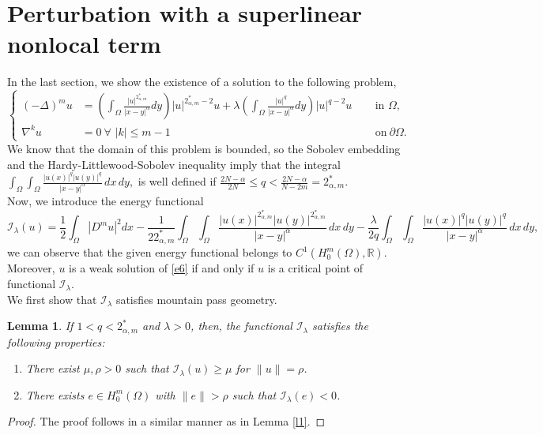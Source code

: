 \documentclass[reqno]{amsart}
\newtheorem{lemma}[theorem]{Lemma}
\newcommand{\la} {\lambda}
\newcommand{\Om}{\Omega}
\newcommand{\al} {\alpha}
\newcommand{\noi} {  \noindent}
\newcommand{\mb} {\mathbb}
\newcommand{\mc} {\mathcal}
\numberwithin{theorem}{section} \numberwithin{equation}{section}
\begin{document}
\section{\bf{Perturbation with a superlinear nonlocal term}}
\noi In the last section, we show the existence of a solution to the following problem,
\[
\left\{\begin{aligned}
(-\Delta)^m u&=\left(\int_{\Om} \frac{|u|^{2_{\al, m}^*}}{|x-y|^\al} d y\right)|u|^{2_{\al, m}^*-2} u+\la\left(\int_{\Om} \frac{|u|^q}{|x-y|^\al} d y\right)|u|^{q-2} u \,&& \text { in } \Om, \\
\nabla^k u&=0\ \forall \, \,  |k|\leq m-1 \,&& \text{ on}\ \partial \Om  .\end{aligned}\right.
\]
We know that the domain of this problem is bounded, so the Sobolev embedding and the Hardy-Littlewood-Sobolev inequality imply that the integral
$\int_{\Om} \int_{\Om} \frac{|u(x)|^q|u(y)|^q}{|x-y|^\al} \, dx \, dy,$
is well defined if $\frac{2N-\al}{2N} \leq q < \frac{2N-\al}{N-2m}=2_{\al, m}^*.$\\
Now, we introduce the energy functional
\[
\mc{I_\la}(u)=\frac{1}{2} \int_{\Om}|D^m u|^2 d x-\frac{1}{22_{\al, m}^*} \int_{\Om} \int_{\Om} \frac{|u(x)|^{2_{\al, m}^*}|u(y)|^{2_{\al, m}^*}}{|x-y|^\al} \, dx \, dy-\frac{\la}{2q} \int_{\Om} \int_{\Om} \frac{|u(x)|^q|u(y)|^q}{|x-y|^\al} \, dx \, dy,
\]
we can observe that the given energy functional belongs to $C^1(H_0^m(\Om), \mb{R})$. Moreover, $u$ is a weak solution of \eqref{e6} if and only if $u$ is a critical point of functional $\mc{I_\la}$.\\
We first show that $\mc{I_\la}$ satisfies mountain pass geometry.
\begin{lemma}\label{l6}
If $1<q<2_{\al, m}^*$ and $\la>0$, then, the functional $\mc{I_\la}$ satisfies the following properties:
\begin{enumerate}
\item There exist $\mu, \rho>0$ such that $\mc{I_\la}(u) \geq \mu$ for $\|u\|=\rho$.
\item There exists $e \in H_0^m(\Om)$ with $\|e\|>\rho$ such that $\mc{I_\la}(e)<0$.
\end{enumerate}
\end{lemma}
\begin{proof}
The proof follows in a similar manner as in Lemma \ref{l1}.   
\end{proof}
\end{document}
